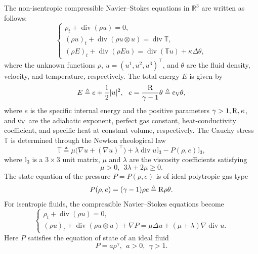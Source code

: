 \documentclass[11pt]{article}
\DeclareMathOperator{\divv}{div}
\begin{document}
The non-isentropic compressible Navier--Stokes equations in $\mathbb{R}^3$ are written as follows:
\begin{equation}\label{1.1}
\begin{cases}
\rho_t +\divv(\rho u) = 0,\\
(\rho u)_t +\divv(\rho u \otimes u) =\divv\mathbb{T},\\
( \rho E)_t +\divv(\rho E u ) =\divv(\mathbb{T} u)+\kappa\Delta\theta,
\end{cases}
\end{equation}
where the unknown functions $\rho$, $u=(u^1,u^2,u^3)^\top$, and $\theta$ are the fluid density, velocity, and temperature, respectively.
The total energy $E$ is given by
\begin{equation*}
E \triangleq e + \frac{1}{2} |u|^2,  \ \  e = \frac{{\rm R} }{\gamma-1} \theta \triangleq {\rm c_V} \theta ,
\end{equation*}
where $e$ is the specific internal energy and the positive parameters $\gamma>1, {\rm R}, \kappa$, and ${\rm c_V}$ are the adiabatic exponent, perfect gas constant, heat-conductivity coefficient, and specific heat at constant volume, respectively.
The Cauchy stress $\mathbb{T}$ is determined through the Newton rheological law
\begin{equation*}
\mathbb{T} \triangleq \mu \big(\nabla u + (\nabla u)^\top \big) + \lambda\divv u \mathbb{I}_3 - P(\rho, e) \mathbb{I}_3,
\end{equation*}
where $\mathbb{I}_3$ is a $3 \times 3$ unit matrix, $\mu$ and $\lambda$ are the viscosity coefficients  satisfying
\begin{equation*}
\mu>0, \ \  3 \lambda + 2 \mu \geq 0.
\end{equation*}
The state equation of the pressure $P = P(\rho, e)$ is of ideal polytropic gas type
\begin{equation*}
P(\rho,e) = (\gamma-1) \rho e \triangleq{\rm R} \rho \theta.
\end{equation*}
For isentropic fluids, the compressible Navier--Stokes equations become
\begin{equation}\label{1.2}
\begin{cases}
\rho_t + \divv(\rho u) = 0,\\
(\rho u)_t +  \divv(\rho u \otimes u)+\nabla P= \mu \Delta u + (\mu + \lambda) \nabla \divv u.
\end{cases}
\end{equation}
Here $P$ satisfies the equation of state of an ideal fluid
\begin{equation*}
P = a \rho^{\gamma}, \ \ a > 0, \ \ \gamma > 1.
\end{equation*}
\end{document}
